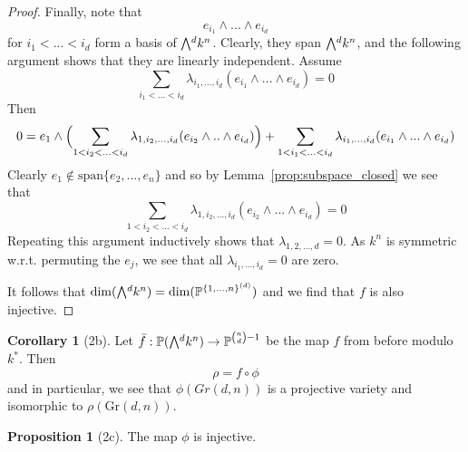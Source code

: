 \documentclass{scrartcl}
\newcommand{\Proj}{\mathbb{P}}
\newcommand{\Gr}{\mathrm{Gr}}
\newcommand{\extpow}{\mathchoice{{\textstyle\bigwedge}}
    {{\bigwedge}}
    {{\textstyle\wedge}}
    {{\scriptstyle\wedge}}}
\newcommand{\vspan}{\mathrm{span}}
\theoremstyle{definition}
\newtheorem{proposition}[definition]{Proposition}
\newtheorem{corollary}[definition]{Corollary}
\begin{document}
\begin{proof}
    Finally, note that
    \begin{equation*}
        e_{i_1} \wedge ... \wedge e_{i_d}
    \end{equation*}
    for $i_1 < ... < i_d$ form a basis of $\extpow^d k^n$.
    Clearly, they span $\extpow^d k^n$, and the following argument shows that they are linearly independent.
    Assume
    \begin{equation*}
        \sum_{i_1 < ... < i_d} \lambda_{i_1, ..., i_d} (e_{i_1} \wedge ... \wedge e_{i_d}) = 0
    \end{equation*}
    Then
    \begin{equation*}
        0 = e_1 \wedge \Bigl( \sum_{1 < i_2 < ... < i_d} \lambda_{1, i_2, ..., i_d} (e_{i_2} \wedge .. \wedge e_{i_d}) \Bigr) + \sum_{1 < i_1 < ... < i_d} \lambda_{i_1, ..., i_d} (e_{i_1} \wedge ... \wedge e_{i_d} )
    \end{equation*}
    Clearly $e_1 \notin \vspan\{e_2, ..., e_n\}$ and so by Lemma~\ref{prop:subspace_closed} we see that
    \begin{equation*}
        \sum_{1 < i_2 < ... < i_d} \lambda_{1, i_2, ..., i_d} (e_{i_2} \wedge ... \wedge e_{i_d}) = 0
    \end{equation*}
    Repeating this argument inductively shows that $\lambda_{1, 2, ..., d} = 0$.
    As $k^n$ is symmetric w.r.t. permuting the $e_j$, we see that all $\lambda_{i_1, ..., i_d} = 0$ are zero.

    It follows that $\dim(\extpow^d k^n) = \dim(\Proj^{\{1, ..., n\}^{(d)}})$ and we find that $f$ is also injective.
\end{proof}
\begin{corollary}[2b]
    \label{prop:image_phi}
    Let $\bar{f}: \Proj(\extpow^d k^n) \to \Proj^{{n \choose d} - 1}$ be the map $f$ from before modulo $k^*$.
    Then
    \begin{equation*}
        \rho = f \circ \phi
    \end{equation*}
    and in particular, we see that $\phi(Gr(d, n))$ is a projective variety and isomorphic to $\rho(\Gr(d, n))$.
\end{corollary}
\begin{proposition}[2c]
    The map $\phi$ is injective.
\end{proposition}
\end{document}
